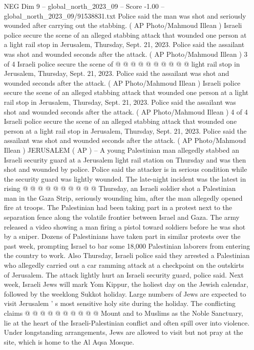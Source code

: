 \begin{textsample}{NEG Dim 9 – global\_north\_2023\_09 – Score -1.00 – global\_north\_2023\_09/91538831.txt}
Police said the man was shot and seriously wounded after carrying out the stabbing. ( AP Photo/Mahmoud Illean ) Israeli police secure the scene of an alleged stabbing attack that wounded one person at a light rail stop in Jerusalem, Thursday, Sept. 21, 2023.
Police said the assailant was shot and wounded seconds after the attack. ( AP Photo/Mahmoud Illean ) 3 of 4 Israeli police secure the scene of @ @ @ @ @ @ @ @ @ @ light rail stop in Jerusalem, Thursday, Sept. 21, 2023.
Police said the assailant was shot and wounded seconds after the attack. ( AP Photo/Mahmoud Illean ) Israeli police secure the scene of an alleged stabbing attack that wounded one person at a light rail stop in Jerusalem, Thursday, Sept. 21, 2023.
Police said the assailant was shot and wounded seconds after the attack. ( AP Photo/Mahmoud Illean ) 4 of 4 Israeli police secure the scene of an alleged stabbing attack that wounded one person at a light rail stop in Jerusalem, Thursday, Sept. 21, 2023.
Police said the assailant was shot and wounded seconds after the attack. ( AP Photo/Mahmoud Illean ) JERUSALEM ( AP ) -- A young Palestinian man allegedly stabbed an Israeli security guard at a Jerusalem light rail station on Thursday and was then shot and wounded by police.
Police said the attacker is in serious condition while the security guard was lightly wounded.
The late-night incident was the latest in rising @ @ @ @ @ @ @ @ @ @ Thursday, an Israeli soldier shot a Palestinian man in the Gaza Strip, seriously wounding him, after the man allegedly opened fire at troops.
The Palestinian had been taking part in a protest next to the separation fence along the volatile frontier between Israel and Gaza.
The army released a video showing a man firing a pistol toward soldiers before he was shot by a sniper.
Dozens of Palestinians have taken part in similar protests over the past week, prompting Israel to bar some 18,000 Palestinian laborers from entering the country to work.
Also Thursday, Israeli police said they arrested a Palestinian who allegedly carried out a car ramming attack at a checkpoint on the outskirts of Jerusalem.
The attack lightly hurt an Israeli security guard, police said.
Next week, Israeli Jews will mark Yom Kippur, the holiest day on the Jewish calendar, followed by the weeklong Sukkot holiday.
Large numbers of Jews are expected to visit Jerusalem ' s most sensitive holy site during the holiday.
The conflicting claims @ @ @ @ @ @ @ @ @ @ Mount and to Muslims as the Noble Sanctuary, lie at the heart of the Israeli-Palestinian conflict and often spill over into violence.
Under longstanding arrangements, Jews are allowed to visit but not pray at the site, which is home to the Al Aqsa Mosque.

\end{textsample}
